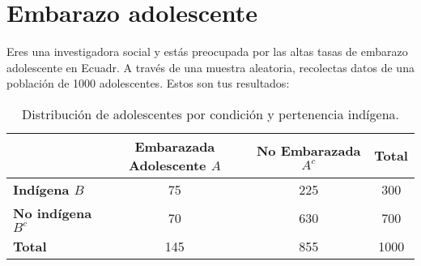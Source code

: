 \documentclass[a4paper]{article}
\begin{document}
\section*{Embarazo adolescente}

Eres una investigadora social y estás preocupada por las altas tasas de embarazo adolescente en Ecuadr. A través de una muestra aleatoria, recolectas datos de una población de 1000 adolescentes. Estos son tus resultados:

\begin{table}[H]
	\centering
	\begin{tabular}{lccc} %
		\toprule
		& \textbf{Embarazada Adolescente $A$} & \textbf{No Embarazada $A^c$} & \textbf{Total} \\
		\midrule
		\textbf{Indígena $B$} & 75 & 225 & 300 \\
		\textbf{No indígena $B^c$} & 70 & 630 & 700 \\
		\midrule
		\textbf{Total} & 145 & 855 & 1000 \\
		\bottomrule
	\end{tabular}
	\caption{Distribución de adolescentes por condición y pertenencia indígena.}
	\label{tabla:distribucion}
\end{table}
\end{document}
